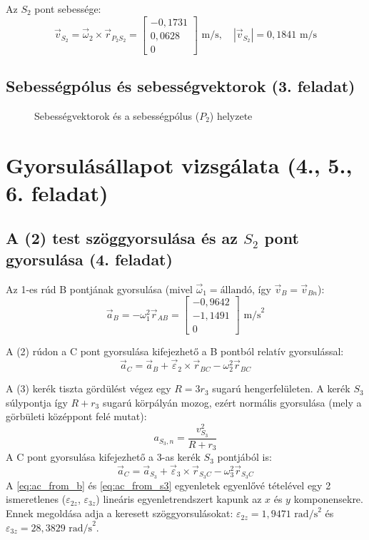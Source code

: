 \documentclass[fleqn,12pt]{article}
\begin{document}
Az $S_2$ pont sebessége:
\begin{equation}
    \vec{v}_{S_2} = \vec{\omega}_2 \times \vec{r}_{P_2 S_2} = \begin{bmatrix} -0,1731 \\ 0,0628 \\ 0 \end{bmatrix} \text{ m/s}, \quad |\vec{v}_{S_2}| = 0,1841 \text{ m/s}
\end{equation}

\subsection{Sebességpólus és sebességvektorok (3. feladat)}
\begin{figure}[H]
    \centering
    
    \caption{Sebességvektorok és a sebességpólus ($P_2$) helyzete}
\end{figure}

\section{Gyorsulásállapot vizsgálata (4., 5., 6. feladat)}
\subsection{A (2) test szöggyorsulása és az $S_2$ pont gyorsulása (4. feladat)}
Az 1-es rúd B pontjának gyorsulása (mivel $\vec{\omega}_1 = \text{állandó}$, így $\vec{v}_B = \vec{v}_{Bn}$):
\begin{equation}
    \vec{a}_B = -\omega_1^2 \vec{r}_{AB} = \begin{bmatrix} -0,9642 \\ -1,1491 \\ 0 \end{bmatrix} \text{ m/s}^2
\end{equation}

A (2) rúdon a C pont gyorsulása kifejezhető a B pontból relatív gyorsulással:
\begin{equation}
    \vec{a}_C = \vec{a}_B + \vec{\varepsilon}_2 \times \vec{r}_{BC} - \omega_2^2 \vec{r}_{BC} \label{eq:ac_from_b}
\end{equation}

A (3) kerék tiszta gördülést végez egy $R=3r_3$ sugarú hengerfelületen. A kerék $S_3$ súlypontja így $R+r_3$ sugarú körpályán mozog, ezért normális gyorsulása (mely a görbületi középpont felé mutat):
\begin{equation}
    a_{S_3, n} = \frac{v_{S_3}^2}{R+r_3}
\end{equation}
A C pont gyorsulása kifejezhető a 3-as kerék $S_3$ pontjából is:
\begin{equation}
    \vec{a}_C = \vec{a}_{S_3} + \vec{\varepsilon}_3 \times \vec{r}_{S_3 C} - \omega_3^2 \vec{r}_{S_3 C} \label{eq:ac_from_s3}
\end{equation}
A \eqref{eq:ac_from_b} és \eqref{eq:ac_from_s3} egyenletek egyenlővé tételével egy 2 ismeretlenes ($\varepsilon_{2z}$, $\varepsilon_{3z}$) lineáris egyenletrendszert kapunk az $x$ és $y$ komponensekre. Ennek megoldása adja a keresett szöggyorsulásokat: $\varepsilon_{2z} = 1,9471 \text{ rad/s}^2$ és $\varepsilon_{3z} = 28,3829 \text{ rad/s}^2$.
\end{document}
